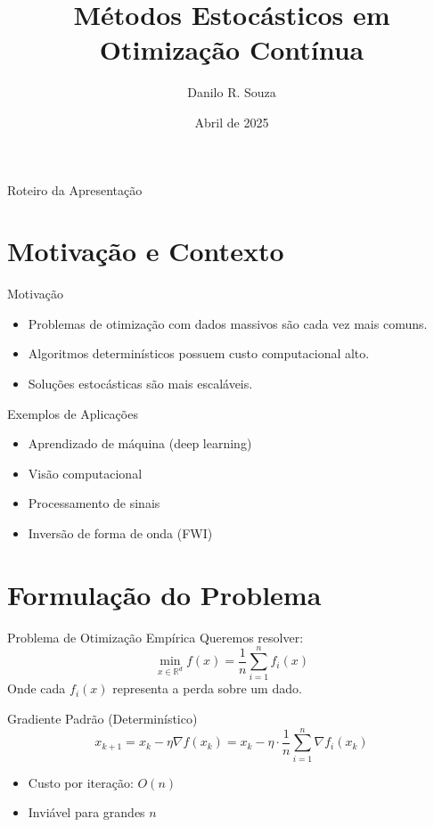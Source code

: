\documentclass{beamer}
\title{M\'etodos Estoc\'asticos em Otimiza\c{c}\~ao Cont\'inua}
\author{Danilo R. Souza}
\institute{Grupo de Otimiza\c{c}\~ao Cont\'inua - Unicamp}
\date{Abril de 2025}
\begin{document}
\frame{\titlepage}

\begin{frame}{Roteiro da Apresenta\c{c}\~ao}
\tableofcontents
\end{frame}

\section{Motiva\c{c}\~ao e Contexto}

\begin{frame}{Motiva\c{c}\~ao}
\begin{itemize}
    \item Problemas de otimiza\c{c}\~ao com dados massivos s\~ao cada vez mais comuns.
    \item Algoritmos determin\'isticos possuem custo computacional alto.
    \item Solu\c{c}\~oes estoc\'asticas s\~ao mais escal\'aveis.
\end{itemize}
\end{frame}

\begin{frame}{Exemplos de Aplica\c{c}\~oes}
\begin{itemize}
    \item Aprendizado de m\'aquina (deep learning)
    \item Vis\~ao computacional
    \item Processamento de sinais
    \item Invers\~ao de forma de onda (FWI)
\end{itemize}
\end{frame}

\section{Formula\c{c}\~ao do Problema}

\begin{frame}{Problema de Otimiza\c{c}\~ao Emp\'irica}
Queremos resolver:
\[
    \min_{x \in \mathbb{R}^d} f(x) = \frac{1}{n} \sum_{i=1}^n f_i(x)
\]
Onde cada \( f_i(x) \) representa a perda sobre um dado.
\end{frame}

\begin{frame}{Gradiente Padr\~ao (Determin\'istico)}
\[
    x_{k+1} = x_k - \eta \nabla f(x_k) = x_k - \eta \cdot \frac{1}{n} \sum_{i=1}^n \nabla f_i(x_k)
\]
\begin{itemize}
    \item Custo por itera\c{c}\~ao: \( O(n) \)
    \item Invi\'avel para grandes \( n \)
\end{itemize}
\end{frame}
\end{document}
